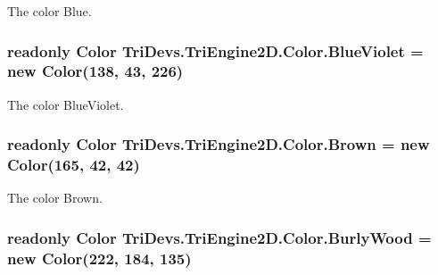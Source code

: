 The color Blue. 

\hypertarget{struct_tri_devs_1_1_tri_engine2_d_1_1_color_a35423e3e26f4ac879e692194056a1271}{
\subsubsection[{Blue\-Violet}]{\setlength{\rightskip}{0pt plus 5cm}readonly {\bf Color} Tri\-Devs.\-Tri\-Engine2\-D.\-Color.\-Blue\-Violet = new {\bf Color}(138, 43, 226)\hspace{0.3cm}{\ttfamily [static]}}}\label{struct_tri_devs_1_1_tri_engine2_d_1_1_color_a35423e3e26f4ac879e692194056a1271}


The color Blue\-Violet. 

\hypertarget{struct_tri_devs_1_1_tri_engine2_d_1_1_color_a1c75f1b8c0170cf41a94f5df64fe2dfc}{
\subsubsection[{Brown}]{\setlength{\rightskip}{0pt plus 5cm}readonly {\bf Color} Tri\-Devs.\-Tri\-Engine2\-D.\-Color.\-Brown = new {\bf Color}(165, 42, 42)\hspace{0.3cm}{\ttfamily [static]}}}\label{struct_tri_devs_1_1_tri_engine2_d_1_1_color_a1c75f1b8c0170cf41a94f5df64fe2dfc}


The color Brown. 

\hypertarget{struct_tri_devs_1_1_tri_engine2_d_1_1_color_a5fa527012c166c88c412c02ad9722502}{
\subsubsection[{Burly\-Wood}]{\setlength{\rightskip}{0pt plus 5cm}readonly {\bf Color} Tri\-Devs.\-Tri\-Engine2\-D.\-Color.\-Burly\-Wood = new {\bf Color}(222, 184, 135)\hspace{0.3cm}{\ttfamily [static]}}}\label{struct_tri_devs_1_1_tri_engine2_d_1_1_color_a5fa527012c166c88c412c02ad9722502}


